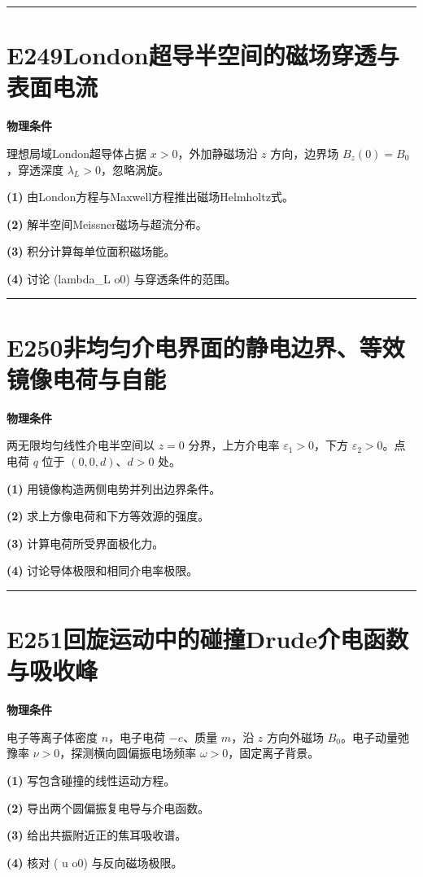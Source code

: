 \documentclass[UTF8,a4paper,11pt,oneside,openany]{ctexbook}
\begin{document}
\par\bigskip\hrule\bigskip
\section*{E249\quad London超导半空间的磁场穿透与表面电流}
\textbf{物理条件}\par 理想局域London超导体占据 \(x>0\)，外加静磁场沿 \(z\) 方向，边界场 \(B_z(0)=B_0\)，穿透深度 \(\lambda_L>0\)，忽略涡旋。
\par\noindent\textbf{(1)} 由London方程与Maxwell方程推出磁场Helmholtz式。
\par\noindent\textbf{(2)} 解半空间Meissner磁场与超流分布。
\par\noindent\textbf{(3)} 积分计算每单位面积磁场能。
\par\noindent\textbf{(4)} 讨论 (lambda\_L	o0) 与穿透条件的范围。

\par\bigskip\hrule\bigskip
\section*{E250\quad 非均匀介电界面的静电边界、等效镜像电荷与自能}
\textbf{物理条件}\par 两无限均匀线性介电半空间以 \(z=0\) 分界，上方介电率 \(\varepsilon_1>0\)，下方 \(\varepsilon_2>0\)。点电荷 \(q\) 位于 \((0,0,d)\)、\(d>0\) 处。
\par\noindent\textbf{(1)} 用镜像构造两侧电势并列出边界条件。
\par\noindent\textbf{(2)} 求上方像电荷和下方等效源的强度。
\par\noindent\textbf{(3)} 计算电荷所受界面极化力。
\par\noindent\textbf{(4)} 讨论导体极限和相同介电率极限。

\par\bigskip\hrule\bigskip
\section*{E251\quad 回旋运动中的碰撞Drude介电函数与吸收峰}
\textbf{物理条件}\par 电子等离子体密度 \(n\)，电子电荷 \(-e\)、质量 \(m\)，沿 \(z\) 方向外磁场 \(B_0\)。电子动量弛豫率 \(\nu>0\)，探测横向圆偏振电场频率 \(\omega>0\)，固定离子背景。
\par\noindent\textbf{(1)} 写包含碰撞的线性运动方程。
\par\noindent\textbf{(2)} 导出两个圆偏振复电导与介电函数。
\par\noindent\textbf{(3)} 给出共振附近正的焦耳吸收谱。
\par\noindent\textbf{(4)} 核对 (
u	o0) 与反向磁场极限。
\end{document}
